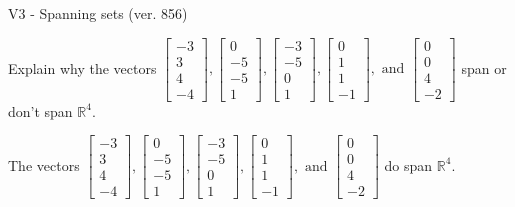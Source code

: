 \begin{exercise}
  \begin{exerciseTitle}V3 - Spanning sets (ver. 856)\end{exerciseTitle}
  \begin{exerciseStatement}
    Explain why the vectors \(\left[\begin{array}{r}
-3 \\
3 \\
4 \\
-4
\end{array}\right] , \left[\begin{array}{r}
0 \\
-5 \\
-5 \\
1
\end{array}\right] , \left[\begin{array}{r}
-3 \\
-5 \\
0 \\
1
\end{array}\right] , \left[\begin{array}{r}
0 \\
1 \\
1 \\
-1
\end{array}\right] , \text{ and } \left[\begin{array}{r}
0 \\
0 \\
4 \\
-2
\end{array}\right]\) span or don't span \(\mathbb{R}^4\). 
	


  \end{exerciseStatement}
  \begin{exerciseAnswer}
   The vectors \(\left[\begin{array}{r}
-3 \\
3 \\
4 \\
-4
\end{array}\right] , \left[\begin{array}{r}
0 \\
-5 \\
-5 \\
1
\end{array}\right] , \left[\begin{array}{r}
-3 \\
-5 \\
0 \\
1
\end{array}\right] , \left[\begin{array}{r}
0 \\
1 \\
1 \\
-1
\end{array}\right] , \text{ and } \left[\begin{array}{r}
0 \\
0 \\
4 \\
-2
\end{array}\right]\) 
  	 do  
	span \(\mathbb{R}^4\).
  



\end{exerciseAnswer}
\end{exercise}
